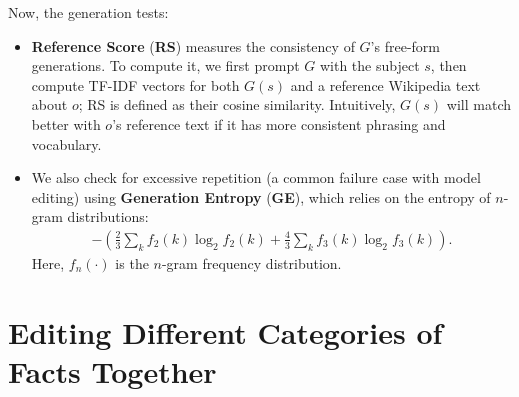 \documentclass{article} %
\begin{document}
Now, the generation tests:
\begin{itemize}[leftmargin=12pt, topsep=0pt]
    \item \textbf{Reference Score} (\textbf{RS}) measures the consistency of $G$'s free-form generations. To compute it, we first prompt $G$ with the subject $s$, then compute TF-IDF vectors for both $G(s)$ and a reference Wikipedia text about $o$; RS is defined as their cosine similarity. Intuitively, $G(s)$ will match better with $o$'s reference text if it has more consistent phrasing and vocabulary.
    \item We also check for excessive repetition (a common failure case with model editing) using \textbf{Generation Entropy} (\textbf{GE}), which relies on the entropy of $n$-gram distributions:
    \begin{align}
        -\left( \frac{2}{3} \sum_k f_2(k) \log_2 f_2(k) + \frac{4}{3} \sum_k f_3(k) \log_2 f_3(k) \right).
    \end{align}
    Here, $f_n(\cdot)$ is the $n$-gram frequency distribution.
\end{itemize}




\section{Editing Different Categories of Facts Together} \label{appendix: mix_fact}
\end{document}
